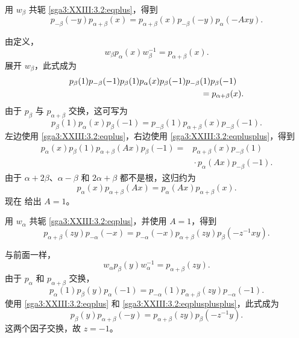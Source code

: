 用 \(w_\beta\) 共轭 \eqref{sga3:XXIII:3.2:eqplus}，得到
\begin{equation}
  p_{-\beta}(-y)p_{\alpha+\beta}(x)
    =p_{\alpha+\beta}(x)p_{-\beta}(-y)p_\alpha(-Axy).
  \tag{++}
  \label{sga3:XXIII:3.2:eqplusplus}
\end{equation}

由定义，
\[
  w_\beta p_\alpha(x)w_\beta^{-1}=p_{\alpha+\beta}(x).
\]
展开 \(w_\beta\)，此式成为
\[
\begin{aligned}
  &p_\beta(1)p_{-\beta}(-1)p_\beta(1)p_\alpha(x)
    p_\beta(-1)p_{-\beta}(1)p_\beta(-1)\\
  &\hspace{55mm}=p_{\alpha+\beta}(x).
\end{aligned}
\]
由于 \(p_\beta\) 与 \(p_{\alpha+\beta}\) 交换，这可写为
\[
  p_\beta(1)p_\alpha(x)p_\beta(-1)
    =p_{-\beta}(1)p_{\alpha+\beta}(x)p_{-\beta}(-1).
\]
左边使用 \eqref{sga3:XXIII:3.2:eqplus}，右边使用 \eqref{sga3:XXIII:3.2:eqplusplus}，得到
\[
\begin{aligned}
  p_\alpha(x)p_\beta(1)p_{\alpha+\beta}(Ax)p_\beta(-1)
   ={}&p_{\alpha+\beta}(x)p_{-\beta}(1)\\
     &{}\cdot p_\alpha(Ax)p_{-\beta}(-1).
\end{aligned}
\]
由于 \(\alpha+2\beta\)、\(\alpha-\beta\) 和 \(2\alpha+\beta\) 都不是根，这归约为
\[
  p_\alpha(x)p_{\alpha+\beta}(Ax)
    =p_\alpha(Ax)p_{\alpha+\beta}(x).
\]
现在 给出 \(A=1\)。

用 \(w_\alpha\) 共轭 \eqref{sga3:XXIII:3.2:eqplus}，并使用 \(A=1\)，得到
\begin{equation}
  p_{\alpha+\beta}(zy)p_{-\alpha}(-x)
   =p_{-\alpha}(-x)p_{\alpha+\beta}(zy)
      p_\beta(-z^{-1}xy).
  \tag{+++}
  \label{sga3:XXIII:3.2:eqplusplusplus}
\end{equation}

与前面一样，
\[
  w_\alpha p_\beta(y)w_\alpha^{-1}=p_{\alpha+\beta}(zy).
\]
由于 \(p_\alpha\) 和 \(p_{\alpha+\beta}\) 交换，
\[
  p_\alpha(1)p_\beta(y)p_\alpha(-1)
    =p_{-\alpha}(1)p_{\alpha+\beta}(zy)p_{-\alpha}(-1).
\]
使用 \eqref{sga3:XXIII:3.2:eqplus} 和 \eqref{sga3:XXIII:3.2:eqplusplusplus}，此式成为
\[
  p_\beta(y)p_{\alpha+\beta}(-y)
    =p_{\alpha+\beta}(zy)p_\beta(-z^{-1}y).
\]
这两个因子交换，故 \(z=-1\)。

